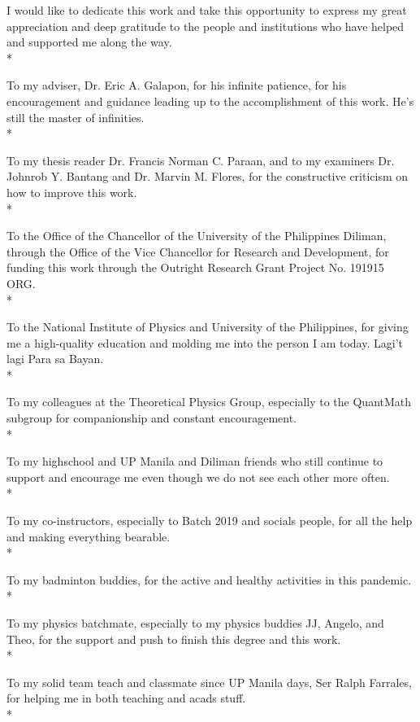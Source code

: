I would like to dedicate this work and take this opportunity to express my great appreciation and deep gratitude to the people and institutions who have helped and supported me along the way.
\\*

To my adviser, Dr. Eric A. Galapon, for his infinite patience, for his encouragement and guidance leading up to the accomplishment of this work. He's still the master of infinities.
\\*

To my thesis reader Dr. Francis Norman C. Paraan, and to my examiners Dr. Johnrob Y. Bantang and Dr. Marvin M. Flores, for the constructive criticism on how to improve this work. 
\\*

To the Office of the Chancellor of the University of the Philippines Diliman, through the Office of the Vice Chancellor for Research and Development, for funding this work through the Outright Research Grant Project No. 191915 ORG.
\\*

To the National Institute of Physics and University of the Philippines, for giving me a high-quality education and molding me into the person I am today. Lagi't lagi Para sa Bayan. 
\\*

To my colleagues at the Theoretical Physics Group, especially to the QuantMath subgroup for companionship and constant encouragement.
\\*

To my highschool and UP Manila and Diliman friends who still continue to support and encourage me even though we do not see each other more often. 
\\*

To my co-instructors, especially to Batch 2019 and socials people, for all the help and making everything bearable. 
\\*

To my badminton buddies, for the active and healthy activities in this pandemic.
\\*



To my physics batchmate, especially to my physics buddies JJ, Angelo, and Theo, for the support and push to finish this degree and this work.
\\*

To my solid team teach and classmate since UP Manila days, Ser Ralph Farrales, for helping me in both teaching and acads stuff.
\\*

